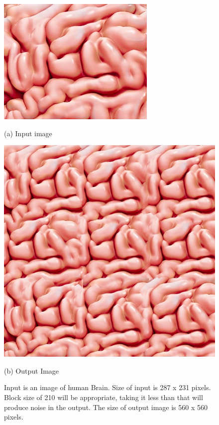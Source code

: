 \documentclass[12pt,a4paper]{report}
\begin{document}
\begin{figure}[H]
  \centering
  \centering
  \includegraphics[scale=0.42]{pics/brain.jpeg}
  \caption{(a) Input image}
  \label{fig:brain}
  \endminipage\hspace*{0.2cm}
  \centering
  \includegraphics[scale=0.4]{pics/brain_210_3.png}
    \caption{(b) Output Image}
  \endminipage
  \caption*{Input is an image of human Brain. Size of input is 287 x 231 pixels. Block size of 210 will be appropriate, taking it less than that will produce noise in the output. The size of output image is 560 x 560 pixels.}
  
\end{figure}

\newpage 
\end{document}
